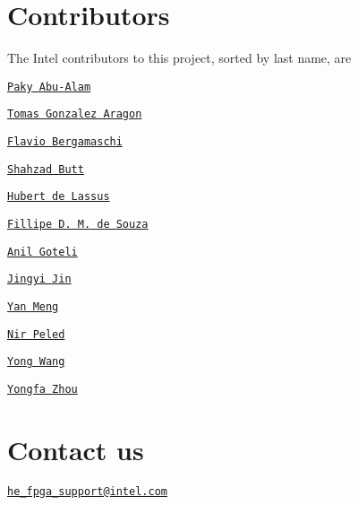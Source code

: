 \section*{Contributors}

The Intel contributors to this project, sorted by last name, are
\begin{DoxyItemize}
\item \href{https://www.linkedin.com/in/paky-abu-alam-89797710/}{\tt Paky Abu-\/\-Alam}
\item \href{https://www.linkedin.com/in/tomas-gonzalez-aragon/}{\tt Tomas Gonzalez Aragon}
\item \href{https://www.linkedin.com/in/flavio-bergamaschi-1634141/}{\tt Flavio Bergamaschi}
\item \href{https://www.linkedin.com/in/shahzad-ahmad-butt-4b44971b/}{\tt Shahzad Butt}
\item \href{https://www.linkedin.com/in/hubert-de-lassus/}{\tt Hubert de Lassus}
\item \href{https://www.linkedin.com/in/fillipe-d-m-de-souza-a8281820/}{\tt Fillipe D. M. de Souza}
\item \href{https://www.linkedin.com/in/anil-goteti}{\tt Anil Goteli}
\item \href{https://www.linkedin.com/in/jingyi-jin-655735/}{\tt Jingyi Jin}
\item \href{https://www.linkedin.com/in/yan-meng-5832895/}{\tt Yan Meng}
\item \href{https://www.linkedin.com/in/nir-peled-4a52266/}{\tt Nir Peled}
\item \href{https://github.com/wangyon1/}{\tt Yong Wang}
\item \href{https://www.linkedin.com/in/yongfa-zhou-16217166/}{\tt Yongfa Zhou}
\end{DoxyItemize}

\section*{Contact us}


\begin{DoxyItemize}
\item \href{mailto:he_fpga_support@intel.com}{\tt he\-\_\-fpga\-\_\-support@intel.\-com} 
\end{DoxyItemize}